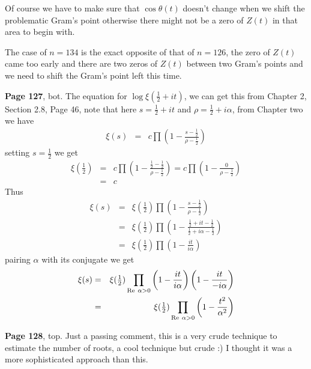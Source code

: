 \documentclass[aps,preprint,preprintnumbers,nofootinbib,showpacs,prd]{revtex4-1}
\newcommand{\nbea}{\begin{eqnarray*}}
\newcommand{\neea}{\end{eqnarray*}}
\newcommand{\re}{{\rm Re}}
\begin{document}
Of course we have to make sure that $\cos \theta(t)$ doesn't change when we shift the problematic Gram's point otherwise there might not be a zero of $Z(t)$ in that area to begin with.

The case of $n = 134$ is the exact opposite of that of $n = 126$, the zero of $Z(t)$ came too early and there are two zeros of $Z(t)$ between two Gram's points and we need to shift the Gram's point left this time.

{\bf Page 127}, bot. The equation for $\log \xi(\tfrac{1}{2} + it)$, we can get this from Chapter 2, Section 2.8, Page 46, note that here $s = \tfrac{1}{2} + it$ and $\rho = \tfrac{1}{2} + i\alpha$, from Chapter two we have
%
\nbea
\xi(s) & = & c \prod \left ( 1 - \frac{s - \tfrac{1}{2}}{\rho - \tfrac{1}{2}} \right )
\neea
%
setting $s = \frac{1}{2}$ we get
%
\nbea
\xi(\tfrac{1}{2}) & = & c \prod \left ( 1 - \frac{\tfrac{1}{2} - \tfrac{1}{2}}{\rho - \tfrac{1}{2}} \right ) = c \prod \left ( 1 - \frac{0}{\rho - \tfrac{1}{2}} \right ) \\
& = & c
\neea
%
Thus
%
\nbea
\xi(s) & = & \xi(\tfrac{1}{2}) \prod \left ( 1 - \frac{s - \tfrac{1}{2}}{\rho - \tfrac{1}{2}} \right ) \\
& = & \xi(\tfrac{1}{2}) \prod \left ( 1 - \frac{\tfrac{1}{2} + it - \tfrac{1}{2}}{\tfrac{1}{2} + i\alpha - \tfrac{1}{2}} \right ) \\
& = & \xi(\tfrac{1}{2}) \prod \left ( 1 - \frac{it}{i\alpha} \right )
\neea
%
pairing $\alpha$ with its conjugate we get
%
\nbea
\xi(s) & = & \xi(\tfrac{1}{2}) \prod_{\re~\alpha > 0} \left ( 1 - \frac{it}{i\alpha} \right )\left ( 1 - \frac{it}{-i\alpha} \right ) \\
& = & \xi(\tfrac{1}{2}) \prod_{\re~\alpha > 0} \left ( 1 - \frac{t^2}{\alpha^2} \right )
\neea
%

{\bf Page 128}, top. Just a passing comment, this is a very crude technique to estimate the number of roots, a cool technique but crude :) I thought it was a more sophisticated approach than this.
\end{document}
